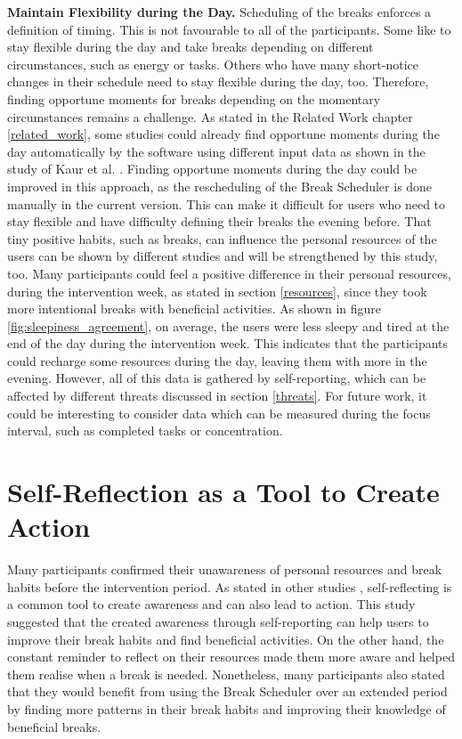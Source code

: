 \documentclass{hasel_thesis}
\begin{document}
\textbf{Maintain Flexibility during the Day.} Scheduling of the breaks enforces a definition of timing. This is not favourable to all of the participants. Some like to stay flexible during the day and take breaks depending on different circumstances, such as energy or tasks. Others who have many short-notice changes in their schedule need to stay flexible during the day, too. Therefore, finding opportune moments for breaks depending on the momentary circumstances remains a challenge. As stated in the Related Work chapter \ref{related_work}, some studies could already find opportune moments during the day automatically by the software using different input data as shown in the study of Kaur et al. \cite{Kaur.2020}. Finding opportune moments during the day could be improved in this approach, as the rescheduling of the Break Scheduler is done manually in the current version. This can make it difficult for users who need to stay flexible and have difficulty defining their breaks the evening before.
That tiny positive habits, such as breaks, can influence the personal resources of the users can be shown by different studies \cite{KimS.ParkY.&Niu.2017,Largo-Wight.2017} and will be strengthened by this study, too. Many participants could feel a positive difference in their personal resources, during the intervention week, as stated in section \ref{resources}, since they took more intentional breaks with beneficial activities. As shown in figure \ref{fig:sleepiness_agreement}, on average, the users were less sleepy and tired at the end of the day during the intervention week. This indicates that the participants could recharge some resources during the day, leaving them with more in the evening. However, all of this data is gathered by self-reporting, which can be affected by different threats discussed in section \ref{threats}. For future work, it could be interesting to consider data which can be measured during the focus interval, such as completed tasks or concentration.


\section{Self-Reflection as a Tool to Create Action}
Many participants confirmed their unawareness of personal resources and break habits before the intervention period. As stated in other studies \cite{GRANT20083}, self-reflecting is a common tool to create awareness and can also lead to action. This study suggested that the created awareness through self-reporting can help users to improve their break habits and find beneficial activities. On the other hand, the constant reminder to reflect on their resources made them more aware and helped them realise when a break is needed. Nonetheless, many participants also stated that they would benefit from using the Break Scheduler over an extended period by finding more patterns in their break habits and improving their knowledge of beneficial breaks. 
\end{document}
